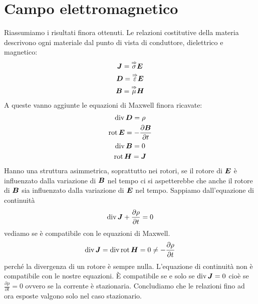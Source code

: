 \chapter{Campo elettromagnetico}
\minitoc
Riassumiamo i risultati finora ottenuti. Le relazioni costitutive della materia descrivono ogni materiale dal punto di vista di conduttore, dielettrico e magnetico:
\begin{subequations}
  \begin{gather}
    \boldsymbol{J}=\overset{\Rightarrow}{\sigma}\boldsymbol{E}\\
    \boldsymbol{D}=\overset{\Rightarrow}{\varepsilon}\boldsymbol{E}\\
    \boldsymbol{B}=\overset{\Rightarrow}{\mu}\boldsymbol{H}
  \end{gather}
\end{subequations}
A queste vanno aggiunte le equazioni di Maxwell finora ricavate:
\begin{subequations}
  \begin{gather}
    \operatorname{div}\boldsymbol{D}=\rho\\
    \operatorname{rot}\boldsymbol{E}=-\frac{\partial\boldsymbol{B}}{\partial t}\\
    \operatorname{div}\boldsymbol{B}=0\\
    \operatorname{rot}\boldsymbol{H}=\boldsymbol{J}
  \end{gather}
\end{subequations}
Hanno una struttura asimmetrica, soprattutto nei rotori, se il rotore di $\boldsymbol{E}$ è influenzato dalla variazione di $\boldsymbol{B}$ nel tempo ci si aspetterebbe che anche il rotore di $\boldsymbol{B}$ sia influenzato dalla variazione di $\boldsymbol{E}$ nel tempo. Sappiamo dall'equazione di continuità
\begin{equation}
  \operatorname{div}\boldsymbol{J}+\frac{\partial\rho}{\partial t}=0
\end{equation}
vediamo se è compatibile con le equazioni di Maxwell.
\begin{equation}
  \operatorname{div}\boldsymbol{J}=\operatorname{div}\operatorname{rot}\boldsymbol{H}=0\neq -\frac{\partial\rho}{\partial t}
\end{equation}
perché la divergenza di un rotore è sempre nulla. L'equazione di continuità non è compatibile con le nostre equazioni. \`E compatibile se e solo se $\operatorname{div}\boldsymbol{J}=0$ cioè se $\frac{\partial\rho}{\partial t}=0$ ovvero se la corrente è stazionaria. Concludiamo che le relazioni fino ad ora esposte valgono solo nel caso stazionario.
